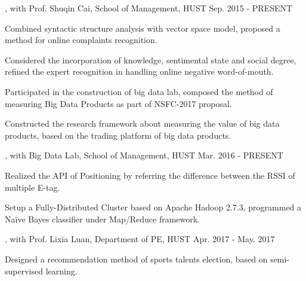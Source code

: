 \vspace{-2.0mm}

\begin{cventries}
\vspace{-1.5mm}

\cvexperience
{, with Prof. Shuqin Cai, School of Management, HUST}
{Sep. 2015 - PRESENT}
{
    \begin{cvitems}
    \item {Combined syntactic structure analysis with vector space model, proposed a method for online complaints recognition.}
    \item {Considered the incorporation of knowledge, sentimental state and social degree, refined the expert recognition in handling online negative word-of-mouth.}
    \item {Participated in the construction of big data lab, composed the method of measuring Big Data Products as part of NSFC-2017 proposal.}
    \item {Constructed the research framework about measuring the value of big data products, based on the trading platform of big data products.}
    \end{cvitems}
}

\cvexperience
{, with Big Data Lab, School of Management, HUST}
{Mar. 2016 - PRESENT}
{
    \begin{cvitems}
    \item {Realized the API of Positioning by referring the difference between the RSSI of multiple E-tag.}
    \item {Setup a Fully-Distributed Cluster based on Apache Hadoop 2.7.3, programmed a Naïve Bayes classifier under Map/Reduce framework.}
    \end{cvitems}
}

\cvexperience
{, with Prof. Lixia Luan, Department of PE, HUST}
{Apr. 2017 - May. 2017}
{
    \begin{cvitems}
    \item {Designed a recommendation method of sports talents election, based on semi-supervised learning.}
    \end{cvitems}
}



\end{cventries}
